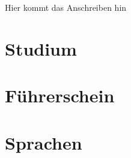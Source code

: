 \documentclass[%
	lebenslaufColor=light-gray,
	idPlain %
]{bewerbung}
\begin{document}
	\begin{anschreiben}
		Hier kommt das Anschreiben hin
	\end{anschreiben}	

	\begin{lebenslauf}[none][]
		\maketitle
		\makePerson

		\section{Studium}

		\section{Führerschein}

		\section{Sprachen}
	\end{lebenslauf}

\end{document}
